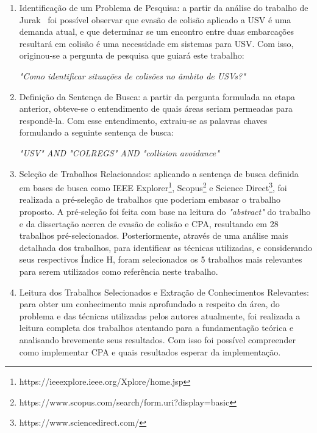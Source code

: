         \begin{enumerate}[label=\alph*)]
            \item Identificação de um Problema de Pesquisa: a partir da análise do trabalho de Jurak~\cite{JURAK2020} foi possível observar que evasão de colisão aplicado a USV é uma demanda atual, e que determinar se um encontro entre duas embarcações resultará em colisão é uma necessidade em sistemas para USV. Com isso, originou-se a pergunta de pesquisa que guiará este trabalho:
            
            \vspace{3mm}
            
            \centerline{\textit{"Como identificar situações de colisões no âmbito de USVs?"}}
            
            \item Definição da Sentença de Busca: a partir da pergunta formulada na etapa anterior, obteve-se o entendimento de quais áreas seriam permeadas para respondê-la. Com esse entendimento, extraiu-se as palavras chaves formulando a seguinte sentença de busca:
            
            \vspace{3mm}
            
            \centerline{\textit{"USV" AND "COLREGS" AND "collision avoidance"}}
            
            \item Seleção de Trabalhos Relacionados: aplicando a sentença de busca definida em bases de busca como IEEE Explorer\footnote{https://ieeexplore.ieee.org/Xplore/home.jsp}, Scopus\footnote{https://www.scopus.com/search/form.uri?display=basic} e Science Direct\footnote{https://www.sciencedirect.com/}, foi realizada a pré-seleção de trabalhos que poderiam embasar o trabalho proposto. A pré-seleção foi feita com base na leitura do \textit{"abstract"} do trabalho e da dissertação acerca de evasão de colisão e CPA, resultando em 28 trabalhos pré-selecionados. Posteriormente, através de uma análise mais detalhada dos trabalhos, para identificar as técnicas utilizadas, e considerando seus respectivos Índice H, foram selecionados os 5 trabalhos mais relevantes para serem utilizados como referência neste trabalho.
            
            \item Leitura dos Trabalhos Selecionados e Extração de Conhecimentos Relevantes: para obter um conhecimento mais aprofundado a respeito da área, do problema e das técnicas utilizadas pelos autores atualmente, foi realizada a leitura completa dos trabalhos atentando para a fundamentação teórica e analisando brevemente seus resultados. Com isso foi possível compreender como implementar CPA e quais resultados esperar da implementação.
            

\end{enumerate}
